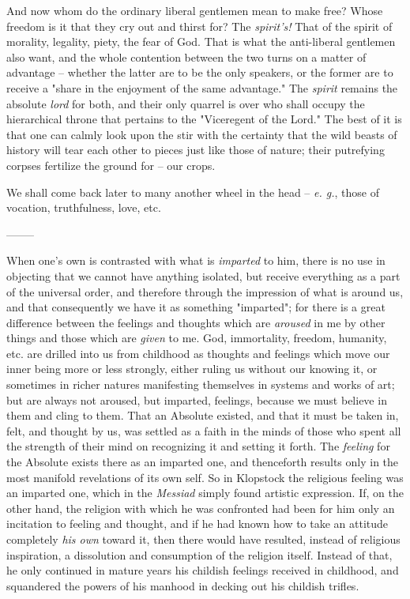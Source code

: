 \documentclass[a4paper]{book}
\begin{document}
And now whom do the ordinary liberal gentlemen mean to make free? Whose 
freedom is it that they cry out and thirst for? The \textit{spirit's!} That of 
the spirit of morality, legality, piety, the fear of God. That is what the 
anti-liberal gentlemen also want, and the whole contention between the two 
turns on a matter of advantage -- whether the latter are to be the only 
speakers, or the former are to receive a "{}share in the enjoyment of the same 
advantage."{} The \textit{spirit} remains the absolute \textit{lord} for both, 
and their only quarrel is over who shall occupy the hierarchical throne that 
pertains to the "{}Viceregent of the Lord."{} The best of it is that one can 
calmly look upon the stir with the certainty that the wild beasts of history 
will tear each other to pieces just like those of nature; their putrefying 
corpses fertilize the ground for -- our crops.

We shall come back later to many another wheel in the head -- \textit{e. g.}, 
those of vocation, truthfulness, love, etc.

\begin{center}
--------\end{center}


When one's own is contrasted with what is \textit{imparted} to him, there is 
no use in objecting that we cannot have anything isolated, but receive 
everything as a part of the universal order, and therefore through the 
impression of what is around us, and that consequently we have it as something 
"{}imparted"{}; for there is a great difference between the feelings and 
thoughts which are \textit{aroused} in me by other things and those which are 
\textit{given} to me. God, immortality, freedom, humanity, etc. are drilled 
into us from childhood as thoughts and feelings which move our inner being 
more or less strongly, either ruling us without our knowing it, or sometimes 
in richer natures manifesting themselves in systems and works of art; but are 
always not aroused, but imparted, feelings, because we must believe in them 
and cling to them. That an Absolute existed, and that it must be taken in, 
felt, and thought by us, was settled as a faith in the minds of those who 
spent all the strength of their mind on recognizing it and setting it forth. 
The \textit{feeling} for the Absolute exists there as an imparted one, and 
thenceforth results only in the most manifold revelations of its own self. So 
in Klopstock the religious feeling was an imparted one, which in the 
\textit{Messiad} simply found artistic expression. If, on the other hand, the 
religion with which he was confronted had been for him only an incitation to 
feeling and thought, and if he had known how to take an attitude completely 
\textit{his own} toward it, then there would have resulted, instead of 
religious inspiration, a dissolution and consumption of the religion itself. 
Instead of that, he only continued in mature years his childish feelings 
received in childhood, and squandered the powers of his manhood in decking out 
his childish trifles.
\end{document}
